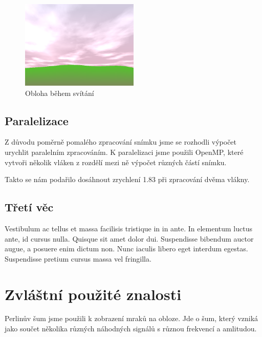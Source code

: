 \documentclass[12pt,a4paper,titlepage,final]{report}
\begin{document}
\begin{figure}[h] \centering
        \includegraphics[width=0.5\textwidth]{images/sky2.png}
    \caption{Obloha během svítání} \label{fig:sky_dawn}
\end{figure}


\section{Paralelizace}

Z důvodu poměrně pomalého zpracování snímku jsme se rozhodli výpočet
urychlit paralelním zpracováním. K paralelizaci jsme použili OpenMP,
které vytvoři několik vláken z rozdělí mezi ně výpočet různých
částí snímku.

Takto se nám podařilo dosáhnout zrychlení 1.83 při zpracování dvěma
vlákny.


\section{Třetí věc}

Vestibulum ac tellus et massa facilisis tristique in in ante. In elementum luctus ante, id cursus nulla. Quisque sit amet dolor dui. Suspendisse bibendum auctor augue, a posuere enim dictum non. Nunc iaculis libero eget interdum egestas. Suspendisse pretium cursus massa vel fringilla.



\chapter{Zvláštní použité znalosti}


Perlinův šum\cite{cite1, cite2} jsme použili k zobrazení mraků na obloze. Jde
o šum, který vzniká jako součet několika různých náhodných signálů s různou
frekvencí a amlitudou.
\end{document}
